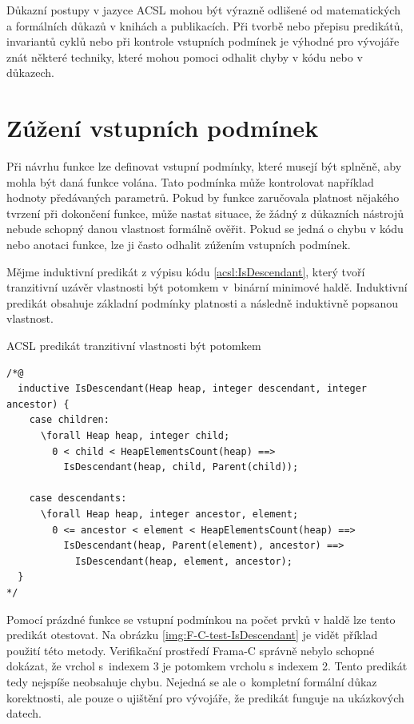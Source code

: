 Důkazní postupy v jazyce ACSL mohou být výrazně odlišené od matematických a formálních důkazů v knihách a publikacích. Při tvorbě nebo přepisu predikátů, invariantů cyklů nebo při kontrole vstupních podmínek je výhodné pro vývojáře znát některé techniky, které mohou pomoci odhalit chyby v kódu nebo v důkazech.

\section{Zúžení vstupních podmínek}

Při návrhu funkce lze definovat vstupní podmínky, které musejí být splněně, aby mohla být daná funkce volána. Tato podmínka může kontrolovat například hodnoty předávaných parametrů. Pokud by funkce zaručovala platnost nějakého tvrzení při dokončení funkce, může nastat situace, že žádný z důkazních nástrojů nebude schopný danou vlastnost formálně ověřit. Pokud se jedná o chybu v kódu nebo anotaci funkce, lze ji často odhalit zúžením vstupních podmínek.

Mějme induktivní predikát z výpisu kódu \ref{acsl:IsDescendant}, který tvoří tranzitivní uzávěr vlastnosti být potomkem v~binární minimové haldě. Induktivní predikát obsahuje základní podmínky platnosti a následně induktivně popsanou vlastnost.

\begin{listing}[H]
	\caption{ACSL predikát tranzitivní vlastnosti být potomkem}
	\label{acsl:IsDescendant}
	\begin{verbatim}
/*@
  inductive IsDescendant(Heap heap, integer descendant, integer ancestor) {
    case children:
      \forall Heap heap, integer child;
        0 < child < HeapElementsCount(heap) ==>
          IsDescendant(heap, child, Parent(child));

    case descendants:
      \forall Heap heap, integer ancestor, element;
        0 <= ancestor < element < HeapElementsCount(heap) ==>
          IsDescendant(heap, Parent(element), ancestor) ==> 
            IsDescendant(heap, element, ancestor);
  }
*/
    \end{verbatim}
\end{listing}

\pagebreak

Pomocí prázdné funkce se vstupní podmínkou na počet prvků v haldě lze tento predikát otestovat. Na obrázku \ref{img:F-C-test-IsDescendant} je vidět příklad použití této metody. Verifikační prostředí Frama-C správně nebylo schopné dokázat, že vrchol s~indexem 3 je potomkem vrcholu s indexem 2. Tento predikát tedy nejspíše neobsahuje chybu. Nejedná se ale o~kompletní formální důkaz korektnosti, ale pouze o ujištění pro vývojáře, že predikát funguje na ukázkových datech.  

